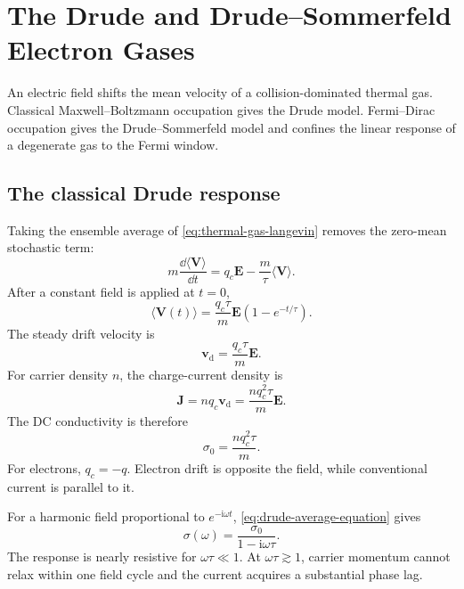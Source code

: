 \chapter{The Drude and Drude--Sommerfeld Electron Gases}
\label{ch:drude-sommerfeld}

An electric field shifts the mean velocity of a collision-dominated thermal
gas.  Classical Maxwell--Boltzmann occupation gives the Drude model.
Fermi--Dirac occupation gives the Drude--Sommerfeld model and confines the
linear response of a degenerate gas to the Fermi window.

\section{The classical Drude response}

Taking the ensemble average of \cref{eq:thermal-gas-langevin} removes the
zero-mean stochastic term:
\begin{equation}
  m\frac{\dd\langle\bm V\rangle}{\dd t}
  =q_c\bm E-\frac{m}{\tau}\langle\bm V\rangle.
  \label{eq:drude-average-equation}
\end{equation}
After a constant field is applied at $t=0$,
\begin{equation}
  \langle\bm V(t)\rangle
  =\frac{q_c\tau}{m}\bm E
   \left(1-e^{-t/\tau}\right).
  \label{eq:drude-transient-velocity}
\end{equation}
The steady drift velocity is
\begin{equation}
  \bm v_{\mathrm d}=\frac{q_c\tau}{m}\bm E.
  \label{eq:drude-steady-velocity}
\end{equation}
For carrier density $n$, the charge-current density is
\begin{equation}
  \bm J=nq_c\bm v_{\mathrm d}
  =\frac{nq_c^2\tau}{m}\bm E.
  \label{eq:drude-current}
\end{equation}
The DC conductivity is therefore
\begin{equation}
  \boxed{\sigma_0=\frac{nq_c^2\tau}{m}.}
  \label{eq:drude-dc-conductivity}
\end{equation}
For electrons, $q_c=-q$.  Electron drift is opposite the field, while
conventional current is parallel to it.

For a harmonic field proportional to $e^{-\mathrm i\omega t}$,
\cref{eq:drude-average-equation} gives
\begin{equation}
  \boxed{
  \sigma(\omega)=\frac{\sigma_0}{1-\mathrm i\omega\tau}.
  }
  \label{eq:drude-ac-conductivity}
\end{equation}
The response is nearly resistive for $\omega\tau\ll1$.  At
$\omega\tau\gtrsim1$, carrier momentum cannot relax within one field cycle and
the current acquires a substantial phase lag.


